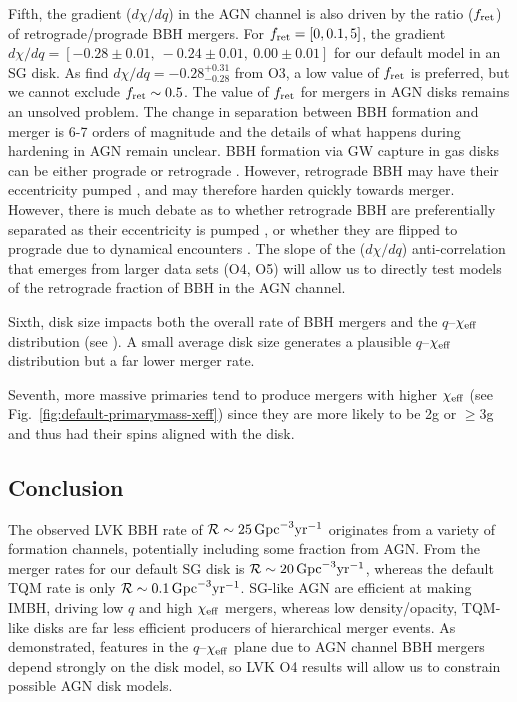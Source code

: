 Fifth, the gradient ($d\chi/dq$) in the AGN channel is also driven by the ratio ($f_{\rm ret}$) of retrograde/prograde BBH mergers.
For $f_{\rm ret}=[0,0.1,5]$, the gradient $d\chi/dq=[-0.28\pm0.01,\ -0.24\pm0.01,\ 0.00\pm0.01]$ for our default model in an SG disk.
As \citet{Callister+21} find $d\chi/dq = -0.28^{+0.31}_{-0.28}$ from O3, a low value of $f_{\rm ret}$ is preferred, but we cannot exclude $f_{\rm ret} \sim 0.5$.
The value of $f_{\rm ret}$ for mergers in AGN disks remains an unsolved problem.
The change in separation between BBH formation and merger is 6-7 orders of magnitude and the details of what happens during hardening in AGN remain unclear.
BBH formation via GW capture in gas disks can be either prograde or retrograde \citep[e.g.][]{DeLaurentiis+23,Whitehead+24,QianLiLai24}.
However, retrograde BBH may have their eccentricity pumped \citep{Li+22-bbh-evo,Calcino+23}, and may therefore harden quickly towards merger.
However, there is much debate as to whether retrograde BBH are preferentially separated as their eccentricity is pumped \citep{Wang+21}, or whether they are flipped to prograde due to dynamical encounters \citep{Samsing+22,McKernanFord24}.
The slope of the ($d\chi/dq$) anti-correlation that emerges from larger data sets (O4, O5) will allow us to directly test models of the retrograde fraction of BBH in the AGN channel.

Sixth, disk size impacts both the overall rate of BBH mergers and the $q$--$\chi_{\rm eff}$ distribution (see ).
A small average disk size generates a plausible $q$--$\chi_{\rm eff}$ distribution but a far lower merger rate.

Seventh, more massive primaries tend to produce mergers with higher $\chi_{\rm eff}$ (see Fig.~\ref{fig:default-primarymass-xeff}) since they are more likely to be 2g or $\geq$3g and thus had their spins aligned with the disk.

\subsection{Conclusion}
The observed LVK BBH rate of $\mathcal{R} \sim 25\,{\rm Gpc}^{-3} {\rm yr}^{-1}$ \citep{Abbott+23-O3b} originates from a variety of formation channels, potentially including some fraction from AGN.
From \citet{McKernan+25-mcfactsI} the merger rates for our default SG disk is $\mathcal{R} \sim 20\,{\rm Gpc}^{-3} \rm{yr}^{-1}$, whereas the default TQM rate is only $\mathcal{R} \sim 0.1\,{\rm Gpc}^{-3} \rm{yr}^{-1}$.
SG-like AGN are efficient at making IMBH, driving low $q$ and high $\chi_{\rm eff}$ mergers, whereas low density/opacity, TQM-like disks are far less efficient producers of hierarchical merger events.
As demonstrated, features in the $q$--$\chi_{\rm eff}$ plane due to AGN channel BBH mergers depend strongly on the disk model, so LVK O4 results will allow us to constrain possible AGN disk models.

